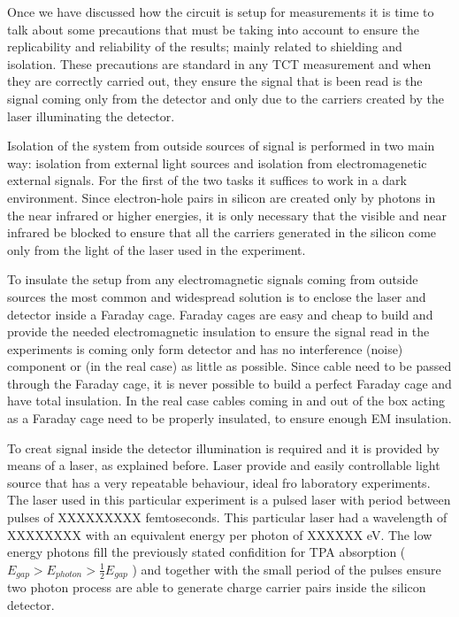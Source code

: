 Once we have discussed how the circuit is setup for measurements it is time to talk about some precautions that must be taking into account to ensure the replicability and reliability of the results; mainly related to shielding and isolation. These precautions are standard in any TCT measurement and when they are correctly carried out, they ensure the signal that is been read is the signal coming only from the detector and only due to the carriers created by the laser illuminating the detector.

Isolation of the system from outside sources of signal is performed in two main way: isolation from external light sources and isolation from electromagenetic external signals. For the first of the two tasks it suffices to work in a dark environment. Since electron-hole pairs in silicon are created only by photons in the near infrared or higher energies, it is only necessary that the visible and near infrared be blocked to ensure that all the carriers generated in the silicon come only from the light of the laser used in the experiment.

To insulate the setup from any electromagnetic signals coming from outside sources the most common and widespread solution is to enclose the laser and detector inside a Faraday cage. Faraday cages are easy and cheap to build and provide the needed electromagnetic insulation to ensure the signal read in the experiments is coming only form detector and has no interference (noise) component or (in the real case) as little as possible. Since cable need to be passed through the Faraday cage, it is never possible to build a perfect Faraday cage and have total insulation. In the real case cables coming in and out of the box acting as a Faraday cage need to be properly insulated, to ensure enough EM insulation.

To creat signal inside the detector illumination is required and it is provided by means of a laser, as explained before. Laser provide and easily controllable light source that has a very repeatable behaviour, ideal fro laboratory experiments. The laser used in this particular experiment is a pulsed laser with period between pulses of XXXXXXXXX femtoseconds. This particular laser had a wavelength of XXXXXXXX with an equivalent energy per photon of XXXXXX eV. The low energy photons fill the previously stated confidition for TPA absorption ($E_{gap} > E_{photon} > \frac{1}{2} E_{gap}$ ) and together with the small period of the pulses ensure two photon process are able to generate charge carrier pairs inside the silicon detector.



